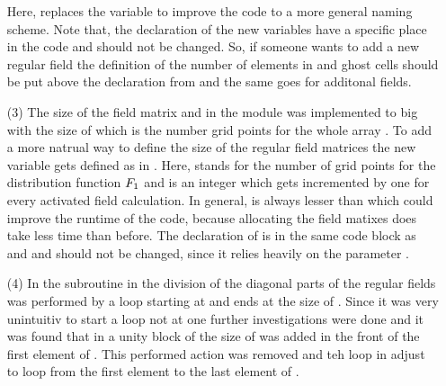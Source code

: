 \begin{enumerate}
\begin{itemize}
    \end{itemize}
    Here,  replaces the variable  to improve the code to a more general naming scheme. Note that, the declaration of the new variables have a specific place in the code and should not be changed. So, if someone wants to add a new regular field the definition of the number of elements in  and ghost cells should be put above the declaration from  and  the same goes for additonal fields. 
    \newpage
    \item[(3)] The size of the field matrix  and  in the module  was implemented to big with the size of  which is the number grid points for the whole array . To add a more natrual way to define the size of the regular field matrices the new variable  gets defined as  in . Here,  stands for the number of grid points for the distribution function $F_1$ and  is an integer which gets incremented by one for every activated field calculation. In general,  is always lesser than  which could improve the runtime of the code, because allocating the field matixes does take less time than before. The declaration of  is in the same code block as  and  and should not be changed, since it relies heavily on the parameter .
    \item[(4)] In the subroutine  in  the division of the diagonal parts of the regular fields was performed by a loop starting at  and ends at the size of . Since it was very unintuitiv to start a loop not at one further investigations were done and it was found that in  a unity block of the size of  was added in the front of the first element of . This performed action was removed and teh loop in  adjust to loop from the first element to the last element of .
\end{enumerate} 

\newpage

